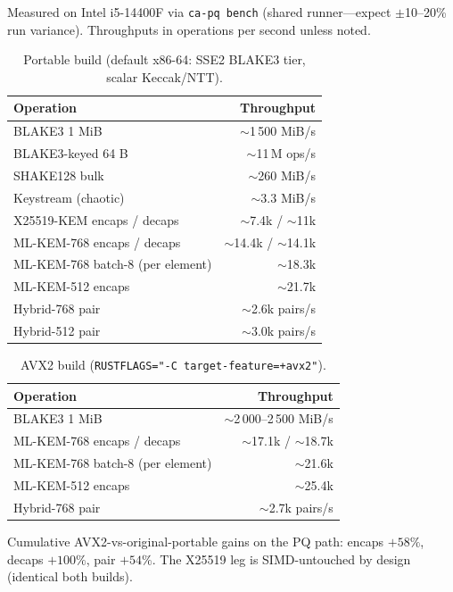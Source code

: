\documentclass[11pt,a4paper]{article}
\begin{document}
Measured on Intel i5-14400F via \texttt{ca-pq bench} (shared runner---expect
$\pm$10--20\% run variance). Throughputs in operations per second unless noted.

\begin{table}[h]
\centering
\caption{Portable build (default x86-64: SSE2 BLAKE3 tier, scalar Keccak/NTT).}
\begin{tabular}{lr}
\toprule
Operation & Throughput \\
\midrule
BLAKE3 1 MiB & $\sim$1\,500 MiB/s \\
BLAKE3-keyed 64 B & $\sim$11\,M ops/s \\
SHAKE128 bulk & $\sim$260 MiB/s \\
Keystream (chaotic) & $\sim$3.3 MiB/s \\
X25519-KEM encaps / decaps & $\sim$7.4k / $\sim$11k \\
ML-KEM-768 encaps / decaps & $\sim$14.4k / $\sim$14.1k \\
ML-KEM-768 batch-8 (per element) & $\sim$18.3k \\
ML-KEM-512 encaps & $\sim$21.7k \\
Hybrid-768 pair & $\sim$2.6k pairs/s \\
Hybrid-512 pair & $\sim$3.0k pairs/s \\
\bottomrule
\end{tabular}
\end{table}

\begin{table}[h]
\centering
\caption{AVX2 build (\texttt{RUSTFLAGS="-C target-feature=+avx2"}).}
\begin{tabular}{lr}
\toprule
Operation & Throughput \\
\midrule
BLAKE3 1 MiB & $\sim$2\,000--2\,500 MiB/s \\
ML-KEM-768 encaps / decaps & $\sim$17.1k / $\sim$18.7k \\
ML-KEM-768 batch-8 (per element) & $\sim$21.6k \\
ML-KEM-512 encaps & $\sim$25.4k \\
Hybrid-768 pair & $\sim$2.7k pairs/s \\
\bottomrule
\end{tabular}
\end{table}

Cumulative AVX2-vs-original-portable gains on the PQ path: encaps $+58\%$, decaps
$+100\%$, pair $+54\%$. The X25519 leg is SIMD-untouched by design (identical both
builds).
\end{document}
